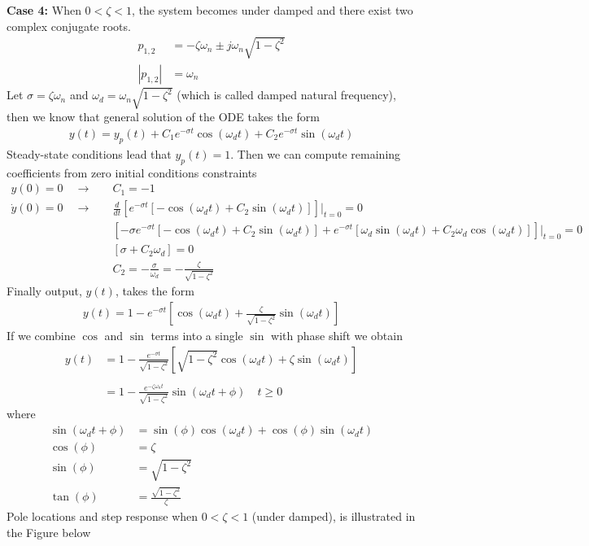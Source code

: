\documentclass[twoside]{article}
\begin{document}
\textbf{Case 4:} When $0 <  \zeta < 1$, the system becomes under damped and there exist 
  two complex conjugate roots.
 \begin{align*}
 p_{1,2} &= - \zeta \omega_n \pm j \omega_n \sqrt{1 - \zeta^2}
 \\
 | p_{1,2} | &= \omega_n
 \end{align*}
 Let $\sigma = \zeta \omega_n$ and $\omega_d = \omega_n \sqrt{1 - \zeta^2}$ (which is called damped
 natural frequency), then we know that general solution of the ODE takes the form
 \begin{align*}
 	y(t) = y_p(t) + C_1 e^{-\sigma t} \cos(\omega_d t) + C_2 e^{-\sigma t} \sin(\omega_d t) 
 \end{align*}
Steady-state conditions lead that $y_p(t) = 1$. Then we can compute remaining coefficients
from zero initial conditions constraints
 \begin{align*}
 y(0) = 0 \quad \rightarrow \quad& C_1 = -1
 \\
 \dot{y}(0) = 0 \quad \rightarrow \quad&
\frac{d}{dt} \left[ e^{-\sigma t} [ -\cos(\omega_d t) + C_2  \sin(\omega_d t) ] \right]|_{t = 0} = 0
\\
& \left[ -\sigma e^{-\sigma t} [ -\cos(\omega_d t) + C_2  \sin(\omega_d t) ] 
+ e^{-\sigma t} [ \omega_d  \sin(\omega_d t) + C_2  \omega_d \cos(\omega_d t) ]  \right] |_{t = 0} = 0
\\
&\left[ \sigma  + C_2  \omega_d  \right] = 0
\\
&C_2 = -\frac{\sigma}{\omega_d} = -\frac{\zeta}{\sqrt{1 - \zeta^2}}
 \end{align*} 
 Finally output, $y(t)$, takes the form
  \begin{align*}
  y(t) = 1 - e^{-\sigma t} \left[ \cos(\omega_d t) + \frac{\zeta}{\sqrt{1 - \zeta^2}} \sin(\omega_d t) \right]
  \end{align*}
%
If we combine $\cos$ and $\sin$  terms into a single $\sin$ with phase shift we obtain
%
  \begin{align*}
    y(t) &= 1 - \frac{e^{-\sigma t}}{ \sqrt{1 - \zeta^2} } \left[ \sqrt{1 - \zeta^2} \cos(\omega_d t) + \zeta \sin(\omega_d t) \right]
    \\
    \\
&= 1 - \frac{e^{- \zeta \omega_n t}}{ \sqrt{1 - \zeta^2} } \sin(\omega_d t + \phi) \quad t \geq 0
  \end{align*}
  where
 \begin{align*}
   \sin(\omega_d t + \phi) &=   \sin( \phi)  \cos(\omega_d t) +   \cos( \phi)   \sin(\omega_d t) 
   \\
   \cos( \phi) &= \zeta 
   \\
   \sin( \phi) &= \sqrt{1 - \zeta^2} 
   \\
   \tan( \phi) &= \frac{\sqrt{1 - \zeta^2} }{\zeta} 
\end{align*}
 Pole locations and step response when $0 < \zeta < 1$ (under damped), is illustrated in
the Figure below
\end{document}
